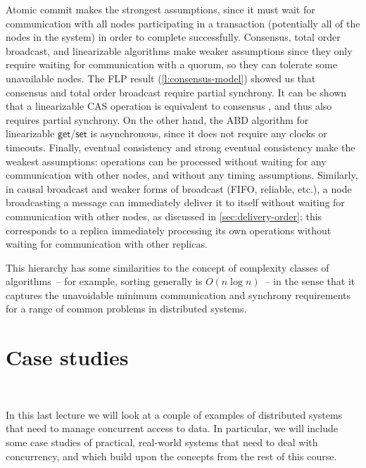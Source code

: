 Atomic commit makes the strongest assumptions, since it must wait for communication with all nodes participating in a transaction (potentially all of the nodes in the system) in order to complete successfully.
Consensus, total order broadcast, and linearizable algorithms make weaker assumptions since they only require waiting for communication with a quorum, so they can tolerate some unavailable nodes.
The FLP result (\autoref{l:consensus-model}) showed us that consensus and total order broadcast require partial synchrony.
It can be shown that a linearizable CAS operation is equivalent to consensus \citep{Herlihy:1991}, and thus also requires partial synchrony.
On the other hand, the ABD algorithm for linearizable $\mathsf{get}$/$\mathsf{set}$ is asynchronous, since it does not require any clocks or timeouts.
Finally, eventual consistency and strong eventual consistency make the weakest assumptions: operations can be processed without waiting for any communication with other nodes, and without any timing assumptions.
Similarly, in causal broadcast and weaker forms of broadcast (FIFO, reliable, etc.), a node broadcasting a message can immediately deliver it to itself without waiting for communication with other nodes, as discussed in \autoref{sec:delivery-order}; this corresponds to a replica immediately processing its own operations without waiting for communication with other replicas.

This hierarchy has some similarities to the concept of complexity classes of algorithms~-- for example, sorting generally is $O(n \log n)$~-- in the sense that it captures the unavoidable minimum communication and synchrony requirements for a range of common problems in distributed systems.


\section{Case studies}\label{sec:case-studies}

\begin{frame}
    \begin{center}
        {\Large{\color{tumblue}{Eventual Consistency}}} \\[2em]
        \mydetails
    \end{center}
\end{frame}

In this last lecture we will look at a couple of examples of distributed systems that need to manage concurrent access to data.
In particular, we will include some case studies of practical, real-world systems that need to deal with concurrency, and which build upon the concepts from the rest of this course.

